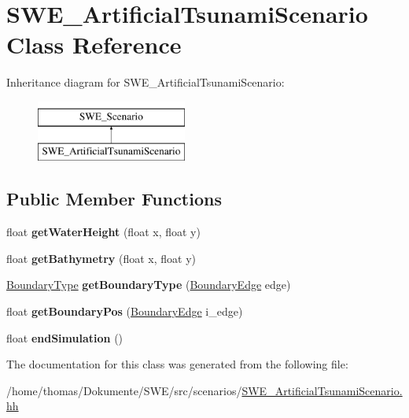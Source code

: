 \hypertarget{classSWE__ArtificialTsunamiScenario}{\section{S\-W\-E\-\_\-\-Artificial\-Tsunami\-Scenario Class Reference}
\label{classSWE__ArtificialTsunamiScenario}
}
Inheritance diagram for S\-W\-E\-\_\-\-Artificial\-Tsunami\-Scenario\-:\begin{figure}[H]
\begin{center}
\leavevmode
\includegraphics[height=2.000000cm]{classSWE__ArtificialTsunamiScenario}
\end{center}
\end{figure}
\subsection*{Public Member Functions}
\begin{DoxyCompactItemize}
\item 
\hypertarget{classSWE__ArtificialTsunamiScenario_aef1c04137080ab89e437d5a912b85dcb}{float {\bfseries get\-Water\-Height} (float x, float y)}\label{classSWE__ArtificialTsunamiScenario_aef1c04137080ab89e437d5a912b85dcb}

\item 
\hypertarget{classSWE__ArtificialTsunamiScenario_acbc4c3127f531862d01c4661da144836}{float {\bfseries get\-Bathymetry} (float x, float y)}\label{classSWE__ArtificialTsunamiScenario_acbc4c3127f531862d01c4661da144836}

\item 
\hypertarget{classSWE__ArtificialTsunamiScenario_a4e0a4c5f1c102a2365f93b41120c65ae}{\hyperlink{SWE__Scenario_8hh_af75d5dd7322fa39ed0af4e7839e600f8}{Boundary\-Type} {\bfseries get\-Boundary\-Type} (\hyperlink{SWE__Scenario_8hh_aa5e01e3f7df312f7b9b0d02521141fcc}{Boundary\-Edge} edge)}\label{classSWE__ArtificialTsunamiScenario_a4e0a4c5f1c102a2365f93b41120c65ae}

\item 
\hypertarget{classSWE__ArtificialTsunamiScenario_ab61b4cb9598a368ef14c2f2a165fe56c}{float {\bfseries get\-Boundary\-Pos} (\hyperlink{SWE__Scenario_8hh_aa5e01e3f7df312f7b9b0d02521141fcc}{Boundary\-Edge} i\-\_\-edge)}\label{classSWE__ArtificialTsunamiScenario_ab61b4cb9598a368ef14c2f2a165fe56c}

\item 
\hypertarget{classSWE__ArtificialTsunamiScenario_a0ed1a18d6766b475f03c1a85e43cf745}{float {\bfseries end\-Simulation} ()}\label{classSWE__ArtificialTsunamiScenario_a0ed1a18d6766b475f03c1a85e43cf745}

\end{DoxyCompactItemize}


The documentation for this class was generated from the following file\-:\begin{DoxyCompactItemize}
\item 
/home/thomas/\-Dokumente/\-S\-W\-E/src/scenarios/\hyperlink{SWE__ArtificialTsunamiScenario_8hh}{S\-W\-E\-\_\-\-Artificial\-Tsunami\-Scenario.\-hh}\end{DoxyCompactItemize}
